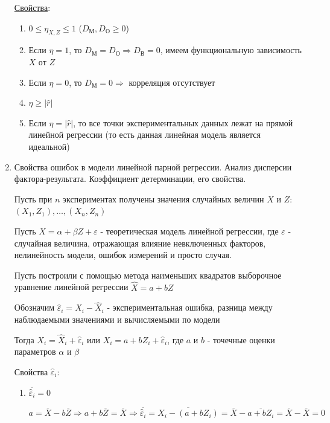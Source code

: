 \begin{enumerate}
    \underline{Свойства}:

    \begin{enumerate}
        \item $0 \leq \eta_{X, Z} \leq 1$ ($D_\text{М}, D_\text{О} \geq 0$)

        \item Если $\eta = 1$, то $D_\text{М} = D_\text{О} \Longrightarrow D_\text{В} = 0$, имеем функциональную зависимость $X$ от $Z$

        \item Если $\eta = 0$, то $D_\text{М} = 0 \Longrightarrow$ корреляция отсутствует

        \item $\eta \geq |\hat r|$

        \item Если $\eta = |\hat r|$, то все точки экспериментальных данных лежат на прямой линейной регрессии 
        (то есть данная линейная модель является идеальной)

    \end{enumerate}

    \item Свойства ошибок в модели линейной парной регрессии. Анализ дисперсии фактора-результата. Коэффициент детерминации, его свойства.

    Пусть при $n$ экспериментах получены значения случайных величин $X$ и $Z$: $(X_1, Z_1), \dots, (X_n, Z_n)$

    Пусть $X = \alpha + \beta Z + \varepsilon$ - теоретическая модель линейной регрессии, где $\varepsilon$ - случайная величина,
    отражающая влияние невключенных факторов, нелинейность модели, ошибок измерений и просто случая.

    Пусть построили с помощью метода наименьших квадратов выборочное уравнение линейной регрессии $\hat X = a + b Z$

    Обозначим $\hat \varepsilon_i = X_i - \hat X_i$ - экспериментальная ошибка, разница между наблюдаемыми значениями и 
    вычисляемыми по модели

    Тогда $X_i = \hat X_i + \hat \varepsilon_i$ или $X_i = a + b Z_i + \hat \varepsilon_i$, где $a$ и $b$ - точечные оценки параметров $\alpha$ и $\beta$

    Свойства $\hat \varepsilon_i$:

    \begin{enumerate}
        \item $\overline{\hat \varepsilon_i} = 0$

        \begin{MyProof}
            $a = \overline{X} - b \overline{Z} \Longrightarrow a + b \overline{Z} = \overline{X} \Longrightarrow \overline{\hat \varepsilon_i} = \overline{X_i - (a + b Z_i)} = \overline{X} - \overline{a + b Z_i} = \overline{X} - \overline{X} = 0$
        \end{MyProof}


\end{enumerate}
\end{enumerate}
